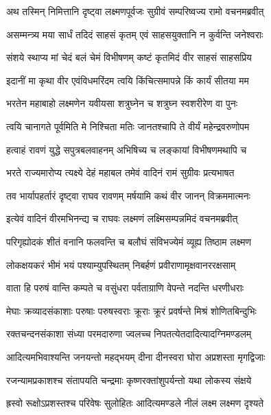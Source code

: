 
\twolineshloka
{अथ तस्मिन् निमित्तानि दृष्ट्वा लक्ष्मणपूर्वजः}
{सुग्रीवं सम्परिष्वज्य रामो वचनमब्रवीत्} %

\twolineshloka
{असम्मन्त्र्य मया सार्धं तदिदं साहसं कृतम्}
{एवं साहसयुक्तानि न कुर्वन्ति जनेश्वराः} %

\twolineshloka
{संशये स्थाप्य मां चेदं बलं चेमं विभीषणम्}
{कष्टं कृतमिदं वीर साहसं साहसप्रिय} %

\twolineshloka
{इदानीं मा कृथा वीर एवंविधमरिंदम}
{त्वयि किंचित्समापन्ने किं कार्यं सीतया मम} %

\twolineshloka
{भरतेन महाबाहो लक्ष्मणेन यवीयसा}
{शत्रुघ्नेन च शत्रुघ्न स्वशरीरेण वा पुनः} %

\twolineshloka
{त्वयि चानागते पूर्वमिति मे निश्चिता मतिः}
{जानतश्चापि ते वीर्यं महेन्द्रवरुणोपम} %

\twolineshloka
{हत्वाहं रावणं युद्धे सपुत्रबलवाहनम्}
{अभिषिच्य च लङ्कायां विभीषणमथापि च} %

\twolineshloka
{भरते राज्यमारोप्य त्यक्ष्ये देहं महाबल}
{तमेवं वादिनं रामं सुग्रीवः प्रत्यभाषत} %

\twolineshloka
{तव भार्यापहर्तारं दृष्ट्वा राघव रावणम्}
{मर्षयामि कथं वीर जानन् विक्रममात्मनः} %

\twolineshloka
{इत्येवं वादिनं वीरमभिनन्द्य च राघवः}
{लक्ष्मणं लक्ष्मिसम्पन्नमिदं वचनमब्रवीत्} %

\twolineshloka
{परिगृह्योदकं शीतं वनानि फलवन्ति च}
{बलौघं संविभज्येमं व्यूह्य तिष्ठाम लक्ष्मण} %

\twolineshloka
{लोकक्षयकरं भीमं भयं पश्याम्युपस्थितम्}
{निबर्हणं प्रवीराणामृक्षवानररक्षसाम्} %

\twolineshloka
{वाता हि परुषं वान्ति कम्पते च वसुंधरा}
{पर्वताग्राणि वेपन्ते नदन्ति धरणीधराः} %

\twolineshloka
{मेघाः क्रव्यादसंकाशाः परुषाः परुषस्वराः}
{क्रूराः क्रूरं प्रवर्षन्ते मिश्रं शोणितबिन्दुभिः} %

\twolineshloka
{रक्तचन्दनसंकाशा संध्या परमदारुणा}
{ज्वलच्च निपतत्येतदादित्यादग्निमण्डलम्} %

\twolineshloka
{आदित्यमभिवाश्यन्ति जनयन्तो महद्भयम्}
{दीना दीनस्वरा घोरा अप्रशस्ता मृगद्विजाः} %

\twolineshloka
{रजन्यामप्रकाशश्च संतापयति चन्द्रमाः}
{कृष्णरक्तांशुपर्यन्तो यथा लोकस्य संक्षये} %

\twolineshloka
{ह्रस्वो रूक्षोऽप्रशस्तश्च परिवेषः सुलोहितः}
{आदित्यमण्डले नीलं लक्ष्म लक्ष्मण दृश्यते} %

